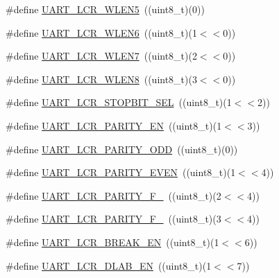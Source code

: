 \begin{DoxyCompactItemize}
\item 
\#define \hyperlink{group___u_a_r_t___private___macros_ga2c64fd92092b8ac1e64b6b1204927682}{\-U\-A\-R\-T\-\_\-\-L\-C\-R\-\_\-\-W\-L\-E\-N5}~((uint8\-\_\-t)(0))
\item 
\#define \hyperlink{group___u_a_r_t___private___macros_ga916fcefe6db8651be1cb1c066726381d}{\-U\-A\-R\-T\-\_\-\-L\-C\-R\-\_\-\-W\-L\-E\-N6}~((uint8\-\_\-t)(1$<$$<$0))
\item 
\#define \hyperlink{group___u_a_r_t___private___macros_ga7746eb5a2aac4b9f86e97ee82e5e2a10}{\-U\-A\-R\-T\-\_\-\-L\-C\-R\-\_\-\-W\-L\-E\-N7}~((uint8\-\_\-t)(2$<$$<$0))
\item 
\#define \hyperlink{group___u_a_r_t___private___macros_ga71ecde192fb0c9facb9ef9c6b77cc687}{\-U\-A\-R\-T\-\_\-\-L\-C\-R\-\_\-\-W\-L\-E\-N8}~((uint8\-\_\-t)(3$<$$<$0))
\item 
\#define \hyperlink{group___u_a_r_t___private___macros_gae18d2dcf0d93727fc4ac3fae1960b1df}{\-U\-A\-R\-T\-\_\-\-L\-C\-R\-\_\-\-S\-T\-O\-P\-B\-I\-T\-\_\-\-S\-E\-L}~((uint8\-\_\-t)(1$<$$<$2))
\item 
\#define \hyperlink{group___u_a_r_t___private___macros_ga4fba4b3d639bdfa713d12466d411f57c}{\-U\-A\-R\-T\-\_\-\-L\-C\-R\-\_\-\-P\-A\-R\-I\-T\-Y\-\_\-\-E\-N}~((uint8\-\_\-t)(1$<$$<$3))
\item 
\#define \hyperlink{group___u_a_r_t___private___macros_ga5ef9bdb85d3f5c3823d667190b19bb40}{\-U\-A\-R\-T\-\_\-\-L\-C\-R\-\_\-\-P\-A\-R\-I\-T\-Y\-\_\-\-O\-D\-D}~((uint8\-\_\-t)(0))
\item 
\#define \hyperlink{group___u_a_r_t___private___macros_ga48df31af63d9e3a65b13a32880bb0b36}{\-U\-A\-R\-T\-\_\-\-L\-C\-R\-\_\-\-P\-A\-R\-I\-T\-Y\-\_\-\-E\-V\-E\-N}~((uint8\-\_\-t)(1$<$$<$4))
\item 
\#define \hyperlink{group___u_a_r_t___private___macros_ga17566959150e60563687a91817ddf844}{\-U\-A\-R\-T\-\_\-\-L\-C\-R\-\_\-\-P\-A\-R\-I\-T\-Y\-\_\-\-F\-\_}~((uint8\-\_\-t)(2$<$$<$4))
\item 
\#define \hyperlink{group___u_a_r_t___private___macros_gaa5d9db8e53dae40ddaa70204fa1b60a3}{\-U\-A\-R\-T\-\_\-\-L\-C\-R\-\_\-\-P\-A\-R\-I\-T\-Y\-\_\-\-F\-\_}~((uint8\-\_\-t)(3$<$$<$4))
\item 
\#define \hyperlink{group___u_a_r_t___private___macros_ga2f83aa82aecd63cf457ea423be643d57}{\-U\-A\-R\-T\-\_\-\-L\-C\-R\-\_\-\-B\-R\-E\-A\-K\-\_\-\-E\-N}~((uint8\-\_\-t)(1$<$$<$6))
\item 
\#define \hyperlink{group___u_a_r_t___private___macros_gaae9c53e30321d4cac13137c66b022e9e}{\-U\-A\-R\-T\-\_\-\-L\-C\-R\-\_\-\-D\-L\-A\-B\-\_\-\-E\-N}~((uint8\-\_\-t)(1$<$$<$7))

\end{DoxyCompactItemize}
